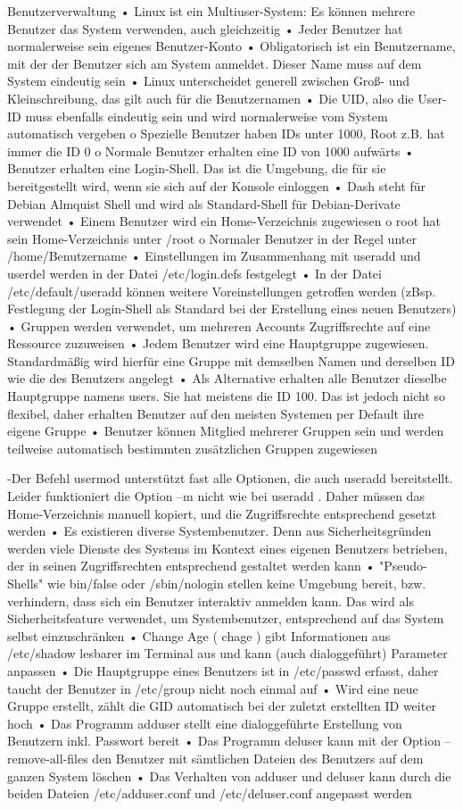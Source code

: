 Benutzerverwaltung
• Linux ist ein Multiuser-System: Es können mehrere Benutzer das System verwenden, auch
gleichzeitig
• Jeder Benutzer hat normalerweise sein eigenes Benutzer-Konto
• Obligatorisch ist ein Benutzername, mit der der Benutzer sich am System anmeldet. Dieser
Name muss auf dem System eindeutig sein
• Linux unterscheidet generell zwischen Groß- und Kleinschreibung, das gilt auch für die
Benutzernamen
• Die UID, also die User-ID muss ebenfalls eindeutig sein und wird normalerweise vom System
automatisch vergeben
o Spezielle Benutzer haben IDs unter 1000, Root z.B. hat immer die ID 0
o Normale Benutzer erhalten eine ID von 1000 aufwärts
• Benutzer erhalten eine Login-Shell. Das ist die Umgebung, die für sie bereitgestellt wird,
wenn sie sich auf der Konsole einloggen
• Dash steht für Debian Almquist Shell und wird als Standard-Shell für Debian-Derivate
verwendet
• Einem Benutzer wird ein Home-Verzeichnis zugewiesen
o root hat sein Home-Verzeichnis unter /root
o Normaler Benutzer in der Regel unter /home/Benutzername
• Einstellungen im Zusammenhang mit useradd und userdel werden in der Datei
/etc/login.defs festgelegt
• In der Datei /etc/default/useradd können weitere Voreinstellungen getroffen werden
(zBsp. Festlegung der Login-Shell als Standard bei der Erstellung eines neuen Benutzers)
• Gruppen werden verwendet, um mehreren Accounts Zugriffsrechte auf eine Ressource
zuzuweisen
• Jedem Benutzer wird eine Hauptgruppe zugewiesen. Standardmäßig wird hierfür eine
Gruppe mit demselben Namen und derselben ID wie die des Benutzers angelegt
• Als Alternative erhalten alle Benutzer dieselbe Hauptgruppe namens users. Sie hat meistens
die ID 100. Das ist jedoch nicht so flexibel, daher erhalten Benutzer auf den meisten
Systemen per Default ihre eigene Gruppe
• Benutzer können Mitglied mehrerer Gruppen sein und werden teilweise automatisch
bestimmten zusätzlichen Gruppen zugewiesen

-Der Befehl usermod unterstützt fast alle Optionen, die auch useradd bereitstellt. Leider
funktioniert die Option –m nicht wie bei useradd . Daher müssen das Home-Verzeichnis
manuell kopiert, und die Zugriffsrechte entsprechend gesetzt werden
• Es existieren diverse Systembenutzer. Denn aus Sicherheitsgründen werden viele Dienste des
Systems im Kontext eines eigenen Benutzers betrieben, der in seinen Zugriffsrechten
entsprechend gestaltet werden kann
• "Pseudo-Shells" wie bin/false oder /sbin/nologin stellen keine Umgebung bereit, bzw.
verhindern, dass sich ein Benutzer interaktiv anmelden kann. Das wird als Sicherheitsfeature
verwendet, um Systembenutzer, entsprechend auf das System selbst einzuschränken
• Change Age ( chage ) gibt Informationen aus /etc/shadow lesbarer im Terminal aus und kann
(auch dialoggeführt) Parameter anpassen
• Die Hauptgruppe eines Benutzers ist in /etc/passwd erfasst, daher taucht der Benutzer in
/etc/group nicht noch einmal auf
• Wird eine neue Gruppe erstellt, zählt die GID automatisch bei der zuletzt erstellten ID weiter
hoch
• Das Programm adduser stellt eine dialoggeführte Erstellung von Benutzern inkl. Passwort
bereit
• Das Programm deluser kann mit der Option --remove-all-files den Benutzer mit
sämtlichen Dateien des Benutzers auf dem ganzen System löschen
• Das Verhalten von adduser und deluser kann durch die beiden Dateien
/etc/adduser.conf und /etc/deluser.conf angepasst werden